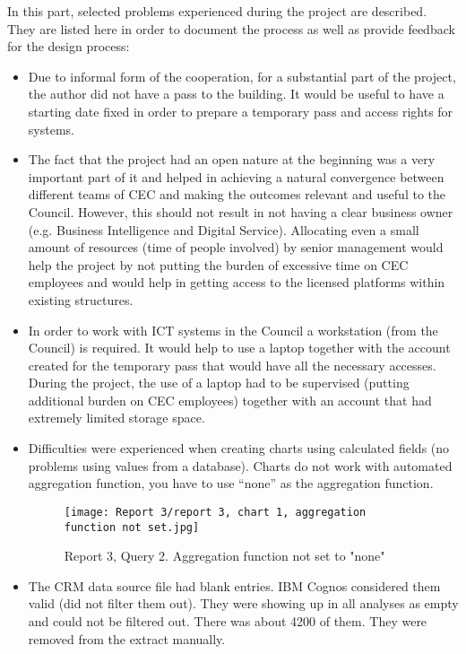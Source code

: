 In this part, selected problems experienced during the project are described. They are listed here in order to document the process as well as provide feedback for the design process:
\begin{itemize}
\item Due to informal form of the cooperation, for a substantial part of the project, the author did not have a pass to the building. It would be useful to have a starting date fixed in order to prepare a temporary pass and access rights for systems.
\item The fact that the project had an open nature at the beginning was a very important part of it and helped in achieving a natural convergence between different teams of CEC and making the outcomes relevant and useful to the Council. However, this should not result in not having a clear business owner (e.g. Business Intelligence and Digital Service). Allocating even a small amount of resources (time of people involved) by senior management would help the project by not putting the burden of excessive time on CEC employees and would help in getting access to the licensed platforms within existing structures.
\item In order to work with ICT systems in the Council a workstation (from the Council) is required. It would help to use a laptop together with the account created for the temporary pass that would have all the necessary accesses. During the project, the use of a laptop had to be supervised (putting additional burden on CEC employees) together with an account that had extremely limited storage space.
\item Difficulties were experienced when creating charts using calculated fields (no problems using values from a database). Charts do not work with automated aggregation function, you have to use “none” as the aggregation function.

\begin{figure}
\centering
     \texttt{[image: Report 3/report 3, chart 1, aggregation function not set.jpg]}
      \caption{Report 3, Query 2. Aggregation function not set to "none"}
       \label{normal_case}
\end{figure}

\item The CRM data source file had blank entries. IBM Cognos considered them valid (did not filter them out). They were showing up in all analyses as empty and could not be filtered out. There was about 4200 of them. They were removed from the extract manually.


\end{itemize}
